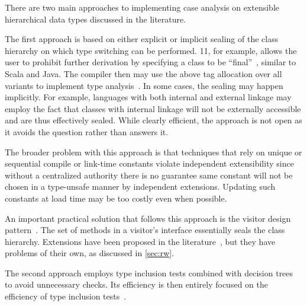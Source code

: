 \noindent
There are two main approaches to implementing case analysis on extensible 
hierarchical data types discussed in the literature.

The first approach is based on either explicit or implicit sealing of the class 
hierarchy on which type switching can be performed. \Cpp{}11, for example, allows 
the user to prohibit further derivation by specifying a class to be ``final''~\cite{C++11}, 
similar to Scala and Java. The compiler then may use the above tag 
allocation over all variants to implement type analysis~\cite[.2]{EmirThesis}. 
In some cases, the sealing may happen implicitly. For example, languages %
with both internal and external linkage may employ the fact that classes 
with internal linkage will not be externally accessible and are thus effectively 
sealed. While clearly efficient, the approach is not open as it avoids the 
question rather than answers it. 

The broader problem with this approach is that techniques that rely on unique or
sequential compile or link-time constants violate independent extensibility 
since without a centralized authority there is no guarantee same constant will 
not be chosen in a type-unsafe manner by independent extensions. Updating such 
constants at load time may be too costly even when possible. %

An important practical solution that follows this approach is the visitor design 
pattern~\cite{DesignPatterns1993}. The set of  methods in a visitor's 
interface essentially seals the class hierarchy. Extensions have been proposed 
in the literature~\cite{Zenger:2001}, but they have problems of their own, 
as discussed in \textsection\ref{sec:rw}.

The second approach employs type inclusion tests combined with decision 
trees~\cite{Cardelli84} to avoid unnecessary checks. Its efficiency is then 
entirely focused on the efficiency of type inclusion 
tests~\cite{Schubert83,Wirth88,Cohen91,Caseau93,Vortex96,Krall97nearoptimal,Vitek97,PQEncoding,FastDynCast,Ducournau08}. 


